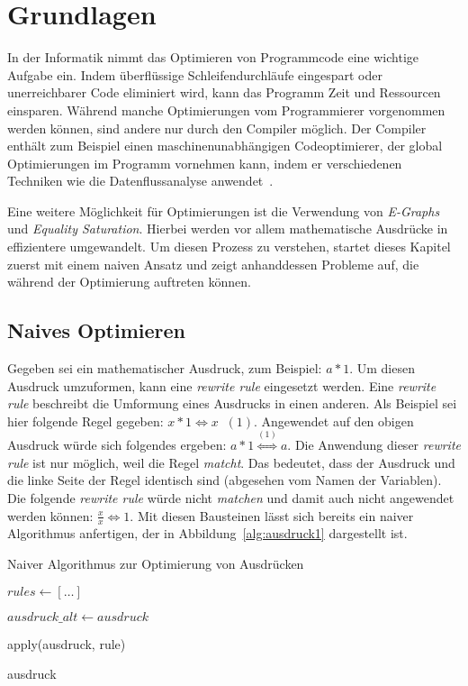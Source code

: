 \section{Grundlagen}\label{sec:grundlagen}

In der Informatik nimmt das Optimieren von Programmcode eine wichtige Aufgabe ein.
Indem überflüssige Schleifendurchläufe eingespart oder unerreichbarer Code eliminiert wird,
kann das Programm Zeit und Ressourcen einsparen. 
Während manche Optimierungen vom Programmierer vorgenommen werden können, sind andere nur 
durch den Compiler möglich.
Der Compiler enthält zum Beispiel einen maschinenunabhängigen Codeoptimierer, der global Optimierungen
im Programm vornehmen kann, indem er verschiedenen Techniken wie die Datenflussanalyse anwendet~\cite{ullman2008}.

\noindent Eine weitere Möglichkeit für Optimierungen ist die Verwendung von \textit{E-Graphs} und \textit{Equality Saturation}.
Hierbei werden vor allem mathematische Ausdrücke in effizientere umgewandelt.
Um diesen Prozess zu verstehen, startet dieses Kapitel zuerst mit einem naiven Ansatz und zeigt anhanddessen Probleme auf, die
während der Optimierung auftreten können.

\subsection{Naives Optimieren}

Gegeben sei ein mathematischer Ausdruck, zum Beispiel: $a * 1$. Um diesen Ausdruck umzuformen, kann eine \textit{rewrite rule} eingesetzt werden.
Eine \textit{rewrite rule} beschreibt die Umformung eines Ausdrucks in einen anderen. Als Beispiel sei hier folgende Regel gegeben: $x * 1 \Leftrightarrow x \;\; (1)$.
Angewendet auf den obigen Ausdruck würde sich folgendes ergeben: $a * 1  \overset{(1)}{\Leftrightarrow} a$.
Die Anwendung dieser \textit{rewrite rule} ist nur möglich, weil die Regel \textit{matcht}. Das bedeutet, dass der Ausdruck und die linke Seite der Regel identisch sind 
(abgesehen vom Namen der Variablen). Die folgende \textit{rewrite rule} würde nicht \textit{matchen} und damit auch nicht angewendet werden können: $\frac{x}{x} \Leftrightarrow 1$.
Mit diesen Bausteinen lässt sich bereits ein naiver Algorithmus anfertigen, der in Abbildung~\ref{alg:ausdruck1} dargestellt ist.

\begin{algorithm}[H]
  \caption{Naiver Algorithmus zur Optimierung von Ausdrücken}\label{alg:ausdruck1}
  \begin{algorithmic}
    \State $rules \gets [\ldots]$
    
      \State $ausdruck\_alt \gets ausdruck$

        \State apply(ausdruck, rule)
        \EndIf
      \EndFor
    \EndWhile

    \State \Return ausdruck
    \EndFunction
  \end{algorithmic}
\end{algorithm}

